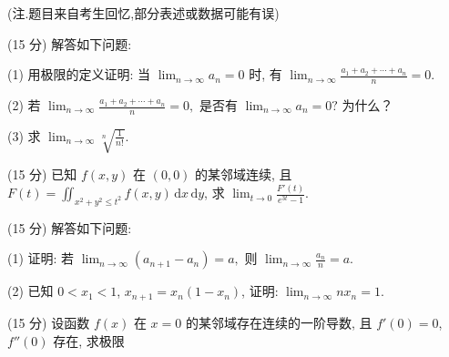 (注.题目来自考生回忆,部分表述或数据可能有误)\par
\par{}
(15 分) 解答如下问题:\par
(1) 用极限的定义证明: 当 $\lim_{n\to \infty}a_n = 0$ 时, 有 $\lim_{n\to \infty}\frac{a_1 + a_2 + \cdots + a_n}{n} = 0.$\par
(2) 若 $\lim_{n\to \infty}\frac{a_1 + a_2 + \cdots + a_n}{n} = 0,$ 是否有 $\lim_{n\to \infty}a_n = 0?$ 为什么？\par
(3) 求 $\lim_{n\to \infty}\sqrt[n]{\frac{1}{n!}}.$\par
\par{}
(15 分) 已知 $f(x, y)$ 在 $(0, 0)$ 的某邻域连续, 且 $F(t) = \iint_{x^2 + y^2 \leq t^2} f(x, y) \, \mathrm{d}x \, \mathrm{d}y$, 求 $\lim_{t \to 0} \frac{F'(t)}{e^{3t} - 1}$.\par
\par{}
(15 分) 解答如下问题:\par
(1) 证明: 若 $\lim_{n\to \infty}(a_{n + 1} - a_n) = a,$ 则 $\lim_{n\to \infty}\frac{a_n}{n} = a.$\par
(2) 已知 $0 < x_{1} < 1$, $x_{n+1} = x_{n}(1 - x_{n})$, 证明: $\lim_{n \to \infty} nx_{n} = 1$.\par
\par{}
\par{}
(15 分) 设函数 $f(x)$ 在 $x = 0$ 的某邻域存在连续的一阶导数, 且 $f'(0) = 0$, $f''(0)$ 存在, 求极限\par
\nopagebreak[4]
\par{}
